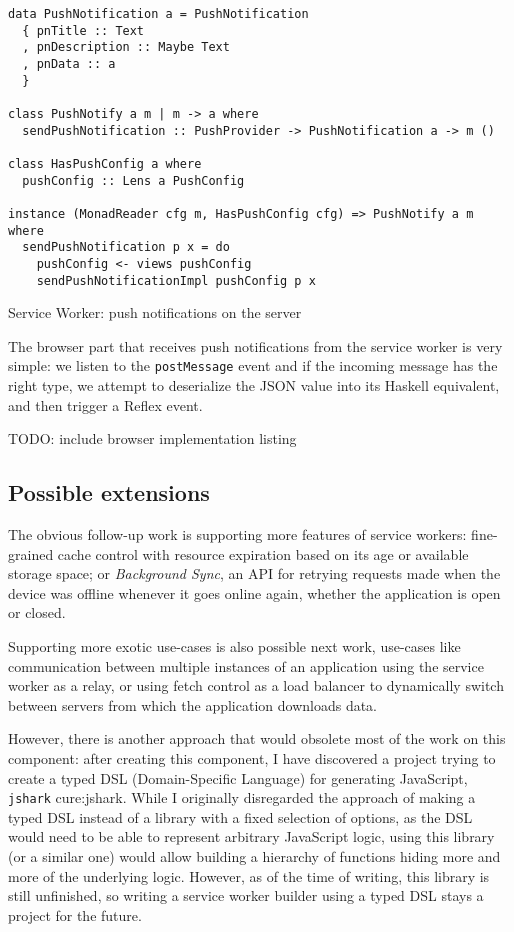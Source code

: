 \documentclass[english,odsaz]{fitthesis}
\begin{document}
\begin{listing}[htbp]
\begin{verbatim}
data PushNotification a = PushNotification
  { pnTitle :: Text
  , pnDescription :: Maybe Text
  , pnData :: a
  }

class PushNotify a m | m -> a where
  sendPushNotification :: PushProvider -> PushNotification a -> m ()

class HasPushConfig a where
  pushConfig :: Lens a PushConfig

instance (MonadReader cfg m, HasPushConfig cfg) => PushNotify a m where
  sendPushNotification p x = do
    pushConfig <- views pushConfig
    sendPushNotificationImpl pushConfig p x
\end{verbatim}
\caption{Service Worker: push notifications on the server \label{sw-server-push}}
\end{listing}

The browser part that receives push notifications from the service worker
is very simple: we listen to the \texttt{postMessage} event and if the incoming message
has the right type, we attempt to deserialize the JSON value into its Haskell
equivalent, and then trigger a Reflex event.

TODO: include browser implementation listing

\subsection{Possible extensions}
\label{sec:orgfe97332}
The obvious follow-up work is supporting more features of service workers:
fine-grained cache control with resource expiration based on its age or
available storage space; or \emph{Background Sync}, an API for retrying requests made
when the device was offline whenever it goes online again, whether the
application is open or closed.

Supporting more exotic use-cases is also possible next work, use-cases like
communication between multiple instances of an application using the service
worker as a relay, or using fetch control as a load balancer to dynamically
switch between servers from which the application downloads data.

However, there is another approach that would obsolete most of the work on this
component: after creating this component, I have discovered a project trying to
create a typed DSL (Domain-Specific Language) for generating JavaScript, \texttt{jshark}
cure:jshark. While I originally disregarded the approach of making a typed DSL
instead of a library with a fixed selection of options, as the DSL would need to
be able to represent arbitrary JavaScript logic, using this library (or a
similar one) would allow building a hierarchy of functions hiding more and more
of the underlying logic. However, as of the time of writing, this library is
still unfinished, so writing a service worker builder using a typed DSL stays a
project for the future.
\end{document}
